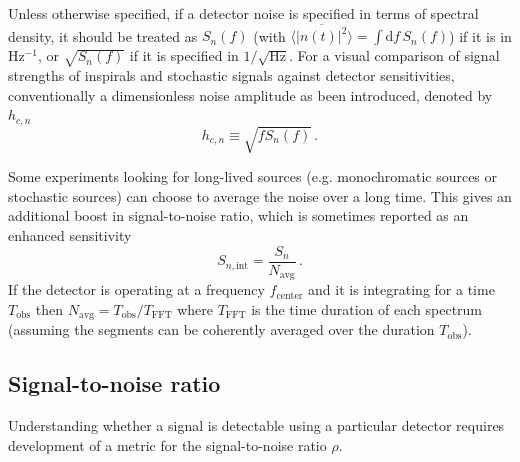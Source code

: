 \documentclass[11pt,a4paper]{article}
\begin{document}
Unless otherwise specified, if a detector noise is specified in terms of spectral density, it should be treated as $S_n(f)$ (with $\langle\overline{|n(t)|^2}\rangle = \int \mathrm{d}f\, S_n(f)$) if it is in Hz$^{-1}$, or $\sqrt{S_n(f)}$ if it is specified in $1/\sqrt{\text{Hz}}$. For a visual comparison of signal strengths of inspirals and stochastic signals against detector sensitivities, conventionally a dimensionless noise amplitude as been introduced, denoted by $h_{c,n}$~\cite{Moore:2014sen}
\begin{equation}
\label{eq:DimlessNoiseAmplitude}
    h_{c,n} \equiv \sqrt{f S_n(f)} \,.
\end{equation}

Some experiments looking for long-lived sources (e.g. monochromatic sources or stochastic sources) can choose to average the noise over a long time. This gives an additional boost in signal-to-noise ratio, which is sometimes reported as an enhanced sensitivity
\begin{equation}
	S_{n,\mathrm{int}} = \frac{S_{n}}{{N_\mathrm{avg}}} \,.
\end{equation}
If the detector is operating at a frequency $f_\mathrm{center}$ and it is integrating for a time $T_\mathrm{obs}$ then $N_\mathrm{avg} = T_\mathrm{obs}/T_\mathrm{FFT}$ where $T_\mathrm{FFT}$ is the time duration of each spectrum (assuming the segments can be coherently averaged over the duration $T_\mathrm{obs}$).



\subsection{Signal-to-noise ratio}

Understanding whether a signal is detectable using a particular detector requires development of a metric for the signal-to-noise ratio $\rho$.
\end{document}
